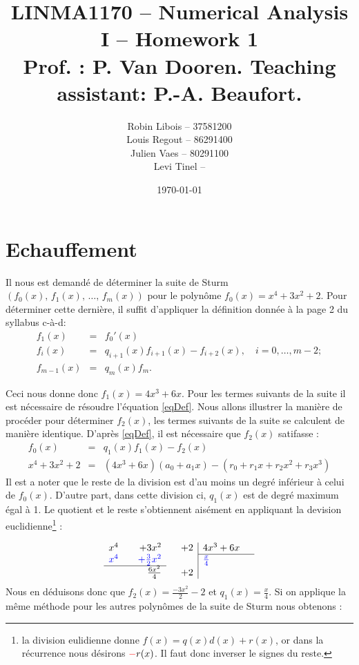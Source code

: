 \documentclass[11pt]{article}
\title{LINMA1170 -- Numerical Analysis I -- Homework 1\\ \normalsize{Prof. : P. Van Dooren. Teaching assistant: P.-A. Beaufort.}\\ }
\author{ Robin Libois -- 37581200 \\ Louis Regout -- 86291400 \\ Julien Vaes -- 80291100 \\ Levi Tinel --}
\date{\today}
\begin{document}
\maketitle



\section*{Echauffement}
Il nous est demandé de déterminer la suite de Sturm  $(f_0(x), \, f_1(x),\, \dots, \, f_m(x))$
pour le polynôme $f_0(x) = x^4 + 3x^2 +2$.
Pour déterminer cette dernière, il suffit d'appliquer la définition donnée à
la page 2 du syllabus c-à-d:
\begin{eqnarray}
  f_1(x) &=& f_0'(x)\\
  f_i(x) &=& q_{i+1}(x)f_{i+1}(x)-f_{i+2}(x), \quad i = 0, \dots, m-2; \label{eqDef} \\
  f_{m-1}(x)&=&q_{m}(x)f_{m}.
\end{eqnarray}

Ceci nous donne donc $f_{1}(x) = 4x^3 + 6x$. Pour les termes suivants de la suite il est nécessaire de
résoudre l'équation \ref{eqDef}. Nous allons illustrer la manière de procéder pour déterminer $f_{2}(x)$, les termes suivants de la suite
se calculent de manière identique. D'après \ref{eqDef}, il est nécessaire que $f_{2}(x)$ satifasse :
\begin{eqnarray}
   f_{0}(x)&=&q_{1}(x)f_{1}(x)-f_{2}(x)\\
   x^4 + 3x^2 +2 &=& (4x^3 + 6x)(a_0 + a_1x) - (r_0+r_1x+r_2x^2+r_3x^3) \label{initSyst}
\end{eqnarray}
Il est a noter que le reste de la division est d'au moins un degré inférieur à celui de $f_{0}(x)$. D'autre part, dans cette division ci, $q_1 (x)$
est de degré maximum égal à 1. Le quotient et le reste s'obtiennent aisément en appliquant la devision euclidienne\footnote{la division eulidienne donne $f (x) = q (x) d (x) + r (x)$,
or dans la récurrence nous désirons ${\color{red}-}r (x)$. Il faut donc inverser le signes du reste.} :

$$
\begin{array}{rrrrr|ll}
 x^4&&+3x^2&&+2 &4x^3+6x  &  \\
\cline{6-7}
 \color{blue}{x^4}&& \color{blue}{+\frac{3}{2}x^2}&& & \color{blue}{\frac{x}{4}} &   \\
\cline{1-3}
&&\frac{6x^2}{4}&&+2&&
\end{array}
$$
Nous en déduisons donc que $f_{2}(x)=\frac{-3x^2}{2}-2$ et $q_{1}(x)=\frac{x}{4}$. Si on applique la même méthode pour les autres polynômes
de la suite de Sturm nous obtenons :
\end{document}
